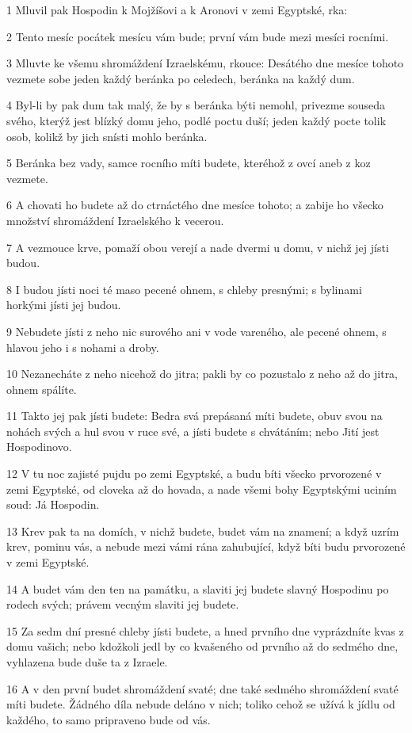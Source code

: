 \par 1 Mluvil pak Hospodin k Mojžíšovi a k Aronovi v zemi Egyptské, rka:
\par 2 Tento mesíc pocátek mesícu vám bude; první vám bude mezi mesíci rocními.
\par 3 Mluvte ke všemu shromáždení Izraelskému, rkouce: Desátého dne mesíce tohoto vezmete sobe jeden každý beránka po celedech, beránka na každý dum.
\par 4 Byl-li by pak dum tak malý, že by s beránka býti nemohl, privezme souseda svého, kterýž jest blízký domu jeho, podlé poctu duší; jeden každý pocte tolik osob, kolikž by jich snísti mohlo beránka.
\par 5 Beránka bez vady, samce rocního míti budete, kteréhož z ovcí aneb z koz vezmete.
\par 6 A chovati ho budete až do ctrnáctého dne mesíce tohoto; a zabije ho všecko množství shromáždení Izraelského k vecerou.
\par 7 A vezmouce krve, pomaží obou verejí a nade dvermi u domu, v nichž jej jísti budou.
\par 8 I budou jísti noci té maso pecené ohnem, s chleby presnými; s bylinami horkými jísti jej budou.
\par 9 Nebudete jísti z neho nic surového ani v vode vareného, ale pecené ohnem, s hlavou jeho i s nohami a droby.
\par 10 Nezanecháte z neho nicehož do jitra; pakli by co pozustalo z neho až do jitra, ohnem spálíte.
\par 11 Takto jej pak jísti budete: Bedra svá prepásaná míti budete, obuv svou na nohách svých a hul svou v ruce své, a jísti budete s chvátáním; nebo Jití jest Hospodinovo.
\par 12 V tu noc zajisté pujdu po zemi Egyptské, a budu bíti všecko prvorozené v zemi Egyptské, od cloveka až do hovada, a nade všemi bohy Egyptskými uciním soud: Já Hospodin.
\par 13 Krev pak ta na domích, v nichž budete, budet vám na znamení; a když uzrím krev, pominu vás, a nebude mezi vámi rána zahubující, když bíti budu prvorozené v zemi Egyptské.
\par 14 A budet vám den ten na památku, a slaviti jej budete slavný Hospodinu po rodech svých; právem vecným slaviti jej budete.
\par 15 Za sedm dní presné chleby jísti budete, a hned prvního dne vyprázdníte kvas z domu vašich; nebo kdožkoli jedl by co kvašeného od prvního až do sedmého dne, vyhlazena bude duše ta z Izraele.
\par 16 A v den první budet shromáždení svaté; dne také sedmého shromáždení svaté míti budete. Žádného díla nebude deláno v nich; toliko cehož se užívá k jídlu od každého, to samo pripraveno bude od vás.
